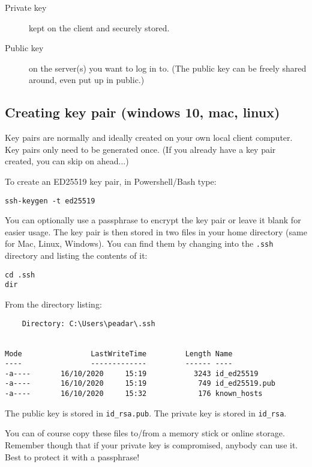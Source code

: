 \begin{description}
\item[Private key]
kept on the client and securely stored.
\item[Public key]
on the server(s) you want to log in to. (The public key can be freely
shared around, even put up in public.)
\end{description}

\subsection{Creating key pair (windows 10, mac, linux)}
\label{sec:creating-key-pair}

Key pairs are normally and ideally created on your own local client computer.
Key pairs only need to be generated once.
(If you already have a key pair created, you can skip on ahead...)

To create an ED25519 key pair, in Powershell/Bash type:

\begin{verbatim}
ssh-keygen -t ed25519
\end{verbatim}

You can optionally use a passphrase to encrypt the key pair or leave it blank for easier usage.
The key pair is then stored in two files in your home directory (same for Mac, Linux, Windows).
You can find them by changing into the \texttt{.ssh} directory and listing the contents of it:

\begin{verbatim}
cd .ssh
dir
\end{verbatim}

From the directory listing:

\begin{verbatim}
    Directory: C:\Users\peadar\.ssh


Mode                LastWriteTime         Length Name
----                -------------         ------ ----
-a----       16/10/2020     15:19           3243 id_ed25519
-a----       16/10/2020     15:19            749 id_ed25519.pub
-a----       16/10/2020     15:32            176 known_hosts
\end{verbatim}

The public key is stored in \texttt{id\_rsa.pub}.
The private key is stored in \texttt{id\_rsa}.

You can of course copy these files to/from a memory stick or online storage.
Remember though that if your private key is compromised, anybody can use it.
Best to protect it with a passphrase!

